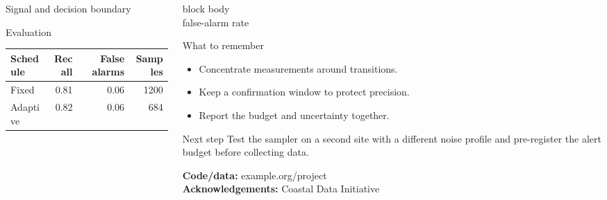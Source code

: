 \documentclass[final]{beamer}
\newcommand{\metric}[2]{\begin{beamercolorbox}[rounded=true,sep=0.7em,wd=\linewidth]{block body}\centering{\fontsize{34}{38}\selectfont\color{teal}\bfseries #1}\\[-2pt]{\large #2}\end{beamercolorbox}}
\begin{document}
\begin{frame}[t]
\begin{columns}[t,totalwidth=0.96\paperwidth]
\begin{column}{0.36\paperwidth}
\begin{block}{Signal and decision boundary}
      \end{block}
      \begin{block}{Evaluation}
        \centering
        \begin{tabular}{lrrr}
          \toprule
          Schedule & Recall & False alarms & Samples\\\midrule
          Fixed & 0.81 & 0.06 & 1200\\
          Adaptive & 0.82 & 0.06 & 684\\
          \bottomrule
        \end{tabular}
      \end{block}
    \end{column}
    \begin{column}{0.25\paperwidth}
      \metric{0.06}{false-alarm rate}
      \vspace{0.9em}
      \begin{block}{What to remember}
        \begin{itemize}\itemsep0.45em
          \item Concentrate measurements around transitions.
          \item Keep a confirmation window to protect precision.
          \item Report the budget and uncertainty together.
        \end{itemize}
      \end{block}
      \begin{block}{Next step}
        Test the sampler on a second site with a different noise profile and
        pre-register the alert budget before collecting data.
      \end{block}
      \vfill
      {\small\textbf{Code/data:} example.org/project\\
      \textbf{Acknowledgements:} Coastal Data Initiative}
    \end{column}
  \end{columns}
\end{frame}
\end{document}
